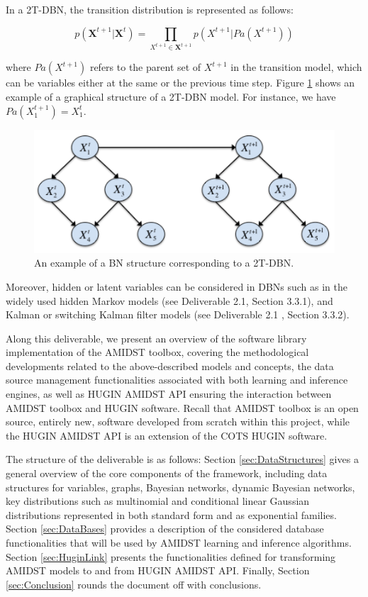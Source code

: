 In a 2T-DBN, the transition distribution is represented as follows:

$$ p(\mathbf{X}^{t+1} |\mathbf{X}^t) = \prod_{X^{t+1}\in \mathbf{X}^{t+1}} p(X^{t+1}|Pa(X^{t+1}))$$ 

\noindent where $Pa(X^{t+1})$ refers to the parent set of $X^{t+1}$ in the transition model, which can be variables either at the same or the previous time step. Figure \ref{Figure:ExampleDBN} shows an example of a graphical structure of a 2T-DBN model. For instance, we have $Pa(X_1^{t+1}) = X_1^{t}$. 

\begin{figure}[ht!]
\begin{center}
\includegraphics[scale=0.6]{./figures/ExampleDBN}
\caption{\label{Figure:ExampleDBN}An example of a BN structure corresponding to a 2T-DBN.}
\end{center}
\end{figure}

Moreover, hidden or latent variables can be considered in DBNs such as in the widely used hidden Markov models (see Deliverable 2.1\cite{Deliverable2.1}, Section 3.3.1), and Kalman or switching Kalman filter models (see Deliverable 2.1 \cite{Deliverable2.1}, Section 3.3.2).


Along this deliverable, we present an overview of the software library implementation of the AMIDST toolbox, covering the methodological developments related to the above-described models and concepts, the data source management functionalities associated with both learning and inference engines, as well as HUGIN AMIDST API ensuring the interaction between AMIDST toolbox and HUGIN software. Recall that AMIDST toolbox is an open source, entirely new, software developed from scratch within this project, while the HUGIN AMIDST API is an extension of the COTS HUGIN software.

The structure of the deliverable is as follows: Section \ref{sec:DataStructures} gives a general overview of the core components of the framework, including data structures for variables, graphs, Bayesian networks, dynamic Bayesian networks, key distributions such as multinomial and conditional linear Gaussian distributions represented in both standard form and as exponential families. Section \ref{sec:DataBases} provides a description of the considered database functionalities that will be used by AMIDST learning and inference algorithms. Section \ref{sec:HuginLink} presents the functionalities defined for transforming AMIDST models to and from HUGIN AMIDST API. Finally, Section \ref{sec:Conclusion} rounds the document off with conclusions.